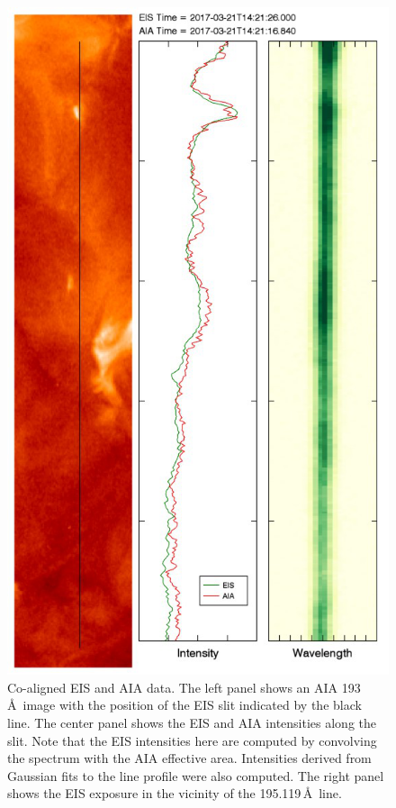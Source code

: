 \documentclass[twocolumn]{aastex62}
\begin{document}
\begin{figure}
    \centering
    \includegraphics[width=0.85\linewidth]{./figures/eis_aia_108.pdf}
    \caption{Co-aligned EIS and AIA data. The left panel shows an AIA 193\,\AA\ image with the position of the EIS slit indicated by the black line. The center panel shows the EIS and AIA intensities along the slit. Note that the EIS intensities here are computed by convolving the spectrum with the AIA effective area. Intensities derived from Gaussian fits to the line profile were also computed. The right panel shows the EIS exposure in the vicinity of the  195.119\,\AA\ line. }
    \label{fig:eis_aia}
\end{figure}
\end{document}
